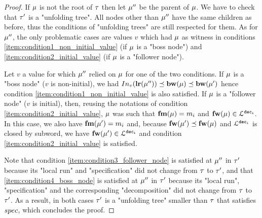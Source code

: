 \begin{proof}
	
	If  $\mu$ is not the root of $\tau$ then let $\mu''$ be the parent of $\mu$. We have to check that $\tau'$ is a "unfolding tree". 
	All nodes other than $\mu''$ have the same children as before, thus the conditions of "unfolding trees" are still respected for them.
	As for $\mu''$, the only problematic cases are values $v$ which had $\mu$ as witness in conditions \ref{item:condition1_non_initial_value} (if $\mu$ is a "boss node") and \ref{item:condition2_initial_value} (if $\mu$ is a "follower node").

	Let $v$ a value for which $\mu''$ relied on $\mu$ for one of the two conditions. 
	If $\mu$ is a "boss node" ($v$ is non-initial), we had $\vinput{v}{\localrunlabel{\node''}} \subword \bosslabel{\node} \subword \bosslabel{\node'}$ hence condition \ref{item:condition1_non_initial_value} is also satisfied. If $\mu$ is a "follower node" ($v$ is initial), then, reusing the notations of condition \ref{item:condition2_initial_value}, $\mu$ was such that $\mathbf{fm}(\mu) = m_i$ and $\mathbf{fw}(\mu) \in \mathcal{L}^{\mathtt{\mathtt{dec}_i}}$. In this case, we also have $\mathbf{fm}(\mu') = m_i$ and, because $\mathbf{fw}(\mu') \preceq \mathbf{fw}(\mu)$ and $\mathcal{L}^{\mathtt{\mathtt{dec}_i}}$ is closed by subword, we have $\mathbf{fw}(\mu') \in \mathcal{L}^{\mathtt{\mathtt{dec}_i}}$ and condition \ref{item:condition2_initial_value} is satisfied.

	Note that condition \ref{item:condition3_follower_node} is satisfied at $\mu''$ in $\tau'$ because its "local run" and "specification" did not change from $\tau$ to $\tau'$, and that \ref{item:condition4_boss_node} is satisfied at $\mu''$ in $\tau'$ because its "local run", "specification" and the corresponding "decomposition" did not change from $\tau$ to $\tau'$.  
	As a result, in both cases $\tau'$ is a "unfolding tree" smaller than $\tau$ that satisfies $\spec$, which concludes the proof. 
\end{proof}

